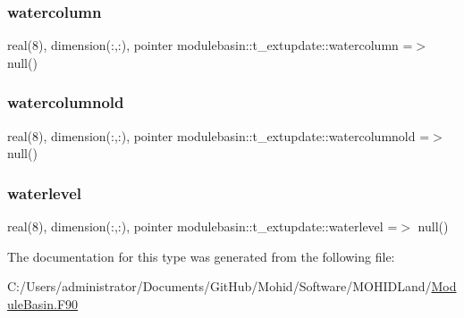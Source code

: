 \subsubsection{\texorpdfstring{watercolumn}{watercolumn}}
{\footnotesize\ttfamily real(8), dimension(\+:,\+:), pointer modulebasin\+::t\+\_\+extupdate\+::watercolumn =$>$ null()\hspace{0.3cm}{\ttfamily [private]}}

\mbox{\label{structmodulebasin_1_1t__extupdate_ae38c4fd65bb04d3ff2dd1ee800704d62}} 
\subsubsection{\texorpdfstring{watercolumnold}{watercolumnold}}
{\footnotesize\ttfamily real(8), dimension(\+:,\+:), pointer modulebasin\+::t\+\_\+extupdate\+::watercolumnold =$>$ null()\hspace{0.3cm}{\ttfamily [private]}}

\mbox{\label{structmodulebasin_1_1t__extupdate_a97a7800b63d16b66c321172d1ae42f5f}} 
\subsubsection{\texorpdfstring{waterlevel}{waterlevel}}
{\footnotesize\ttfamily real(8), dimension(\+:,\+:), pointer modulebasin\+::t\+\_\+extupdate\+::waterlevel =$>$ null()\hspace{0.3cm}{\ttfamily [private]}}



The documentation for this type was generated from the following file\+:\begin{DoxyCompactItemize}
\item 
C\+:/\+Users/administrator/\+Documents/\+Git\+Hub/\+Mohid/\+Software/\+M\+O\+H\+I\+D\+Land/\mbox{\hyperlink{_module_basin_8_f90}{Module\+Basin.\+F90}}\end{DoxyCompactItemize}
